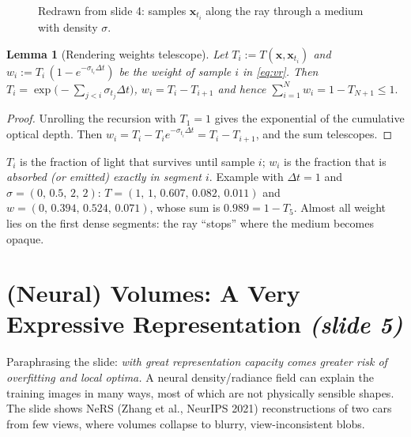 \documentclass[11pt,a4paper]{article}
\newcommand{\bx}{\bm{x}}
\theoremstyle{definition}
\theoremstyle{plain}
\newtheorem{lemma}[definition]{Lemma}
\theoremstyle{remark}
\begin{document}
\begin{figure}[htbp]
\centering
{}
\caption{Redrawn from slide 4: samples $\bx_{t_i}$ along the ray through a medium with density $\sigma$.}
\end{figure}

\begin{lemma}[Rendering weights telescope]\label{lem:telescope}
Let $T_i:=T(\bx,\bx_{t_i})$ and $w_i:=T_i\,(1-e^{-\sigma_{t_i}\Delta t})$ be the weight of sample $i$ in \eqref{eq:vr}.
Then $T_i=\exp\!\bigl(-\sum_{j<i}\sigma_{t_j}\Delta t\bigr)$, $w_i=T_i-T_{i+1}$ and hence
$\sum_{i=1}^N w_i = 1-T_{N+1}\le 1.$
\end{lemma}
\begin{proof}
Unrolling the recursion with $T_1=1$ gives the exponential of the cumulative optical depth.
Then $w_i=T_i-T_i e^{-\sigma_{t_i}\Delta t}=T_i-T_{i+1}$, and the sum telescopes.
\end{proof}
\begin{intuition}
$T_i$ is the fraction of light that survives until sample $i$; $w_i$ is the fraction that is \emph{absorbed (or emitted)
exactly in segment $i$}. Example with $\Delta t=1$ and $\sigma=(0,\,0.5,\,2,\,2)$: $T=(1,\,1,\,0.607,\,0.082,\,0.011)$ and
$w=(0,\,0.394,\,0.524,\,0.071)$, whose sum is $0.989=1-T_5$. Almost all weight lies on the first dense segments:
the ray ``stops'' where the medium becomes opaque.
\end{intuition}

\section{(Neural) Volumes: A Very Expressive Representation \emph{(slide 5)}}
Paraphrasing the slide: \emph{with great representation capacity comes greater risk of overfitting and local optima.}
A neural density/radiance field can explain the training images in many ways, most of which are not physically
sensible shapes. The slide shows NeRS (Zhang et al., NeurIPS 2021) reconstructions of two cars from few views, where
volumes collapse to blurry, view-inconsistent blobs.
\end{document}
